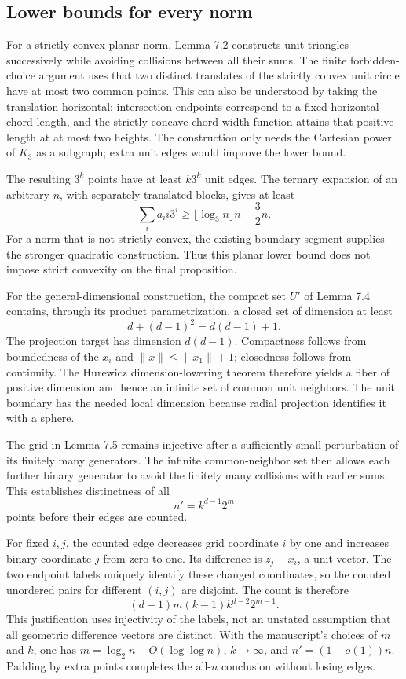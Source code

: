 \documentclass[10pt]{article}
\begin{document}
\subsection*{Lower bounds for every norm}
For a strictly convex planar norm, Lemma 7.2 constructs unit triangles successively while avoiding collisions between all their sums. The finite forbidden-choice argument uses that two distinct translates of the strictly convex unit circle have at most two common points. This can also be understood by taking the translation horizontal: intersection endpoints correspond to a fixed horizontal chord length, and the strictly concave chord-width function attains that positive length at at most two heights. The construction only needs the Cartesian power of \(K_3\) as a subgraph; extra unit edges would improve the lower bound.\par
The resulting \(3^k\) points have at least \(k3^k\) unit edges. The ternary expansion of an arbitrary \(n\), with separately translated blocks, gives at least \[\sum_i a_i i3^i\ge \lfloor\log_3 n\rfloor n-\frac32 n.\] For a norm that is not strictly convex, the existing boundary segment supplies the stronger quadratic construction. Thus this planar lower bound does not impose strict convexity on the final proposition.\par
For the general-dimensional construction, the compact set \(U'\) of Lemma 7.4 contains, through its product parametrization, a closed set of dimension at least \[d+(d-1)^2=d(d-1)+1.\] The projection target has dimension \(d(d-1)\). Compactness follows from boundedness of the \(x_i\) and \(\|x\|\le\|x_1\|+1\); closedness follows from continuity. The Hurewicz dimension-lowering theorem therefore yields a fiber of positive dimension and hence an infinite set of common unit neighbors. The unit boundary has the needed local dimension because radial projection identifies it with a sphere.\par
The grid in Lemma 7.5 remains injective after a sufficiently small perturbation of its finitely many generators. The infinite common-neighbor set then allows each further binary generator to avoid the finitely many collisions with earlier sums. This establishes distinctness of all \[n'=k^{d-1}2^m\] points before their edges are counted.\par
For fixed \(i,j\), the counted edge decreases grid coordinate \(i\) by one and increases binary coordinate \(j\) from zero to one. Its difference is \(z_j-x_i\), a unit vector. The two endpoint labels uniquely identify these changed coordinates, so the counted unordered pairs for different \((i,j)\) are disjoint. The count is therefore \[(d-1)m(k-1)k^{d-2}2^{m-1}.\] This justification uses injectivity of the labels, not an unstated assumption that all geometric difference vectors are distinct. With the manuscript’s choices of \(m\) and \(k\), one has \(m=\log_2 n-O(\log\log n)\), \(k\to\infty\), and \(n'=(1-o(1))n\). Padding by extra points completes the all-\(n\) conclusion without losing edges.\par
\end{document}

